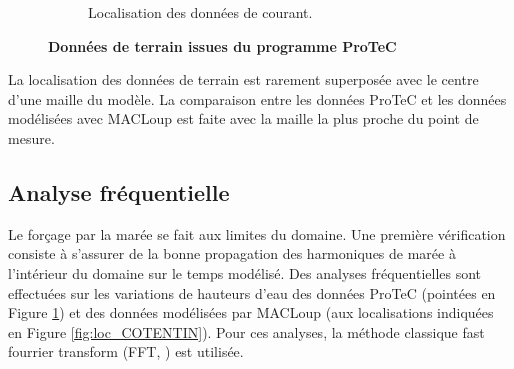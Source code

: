 \documentclass[10pt,a4paper,titlepage]{article}
\begin{document}
\begin{figure}[!h]
\begin{subfigure}{0.35\linewidth}
        \caption{Localisation des données de courant.}
        \label{fig:sed_adcl_b}
    \end{subfigure}
	\caption{\textbf{Données de terrain issues du programme ProTeC}}
	\label{fig:sed-adcl}
\end{figure}

La localisation des données de terrain est rarement superposée avec le centre d'une maille du modèle.
La comparaison entre les données ProTeC et les données modélisées avec MACLoup est faite avec la maille la plus proche du point de mesure.




\subsection{Analyse fréquentielle}
\label{sub:ana_freq}
Le forçage par la marée se fait aux limites du domaine.
Une première vérification consiste à s'assurer de la bonne propagation des harmoniques de marée à l'intérieur du domaine sur le temps modélisé.
Des analyses fréquentielles sont effectuées sur les variations de hauteurs d'eau des données ProTeC (pointées en Figure \ref{fig:sed_adcl_b}) et des données modélisées par MACLoup (aux localisations indiquées en Figure \ref{fig:loc_COTENTIN}).
Pour ces analyses, la méthode classique fast fourrier transform (FFT, \cite{FFT}) est utilisée.
\end{document}
